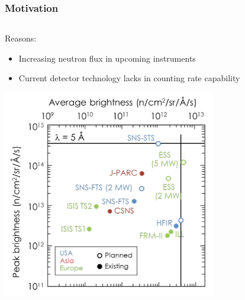 \documentclass[xcolor=x11names, compress, handout]{beamer}
\renewcommand{\(}{\begin{columns}}
\renewcommand{\)}{\end{columns}}
\newcommand{\<}[1]{\begin{column}{#1}}
\renewcommand{\>}{\end{column}}
\begin{document}
\begin{frame}
  \frametitle{Motivation}

  \begin{columns}
  \begin{column}{0.5\textwidth}
  Reasons:
  \begin{itemize}
  \item Increasing neutron flux in upcoming instruments
  \item Current detector technology lacks in counting rate capability
  \end{itemize}
  \begin{center}
  \includegraphics[width=0.7\textwidth]{images/neutron_sources.png}
  \end{center}
  \end{column}


\end{columns}
\end{frame}
\end{document}
